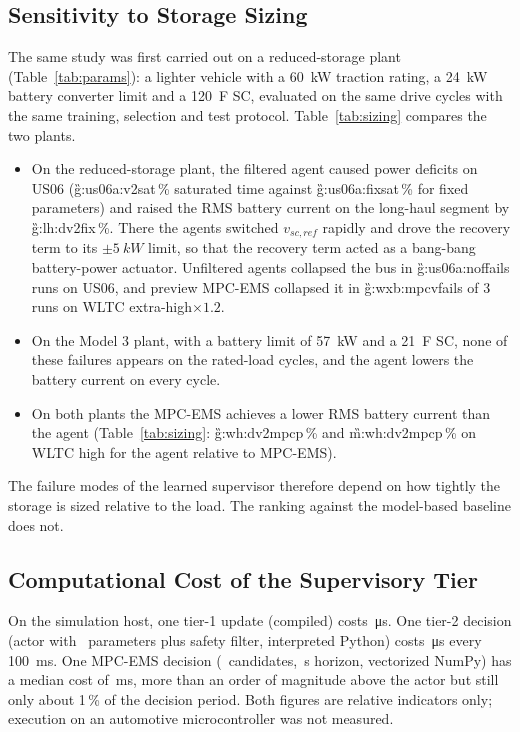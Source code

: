 \subsection{Sensitivity to Storage Sizing}\label{sec:res_sizing}

The same study was first carried out on a reduced-storage plant (Table~\ref{tab:params}): a lighter vehicle with a \SI{60}{kW} traction rating, a \SI{24}{kW} battery converter limit and a \SI{120}{F} SC, evaluated on the same drive cycles with the same training, selection and test protocol. Table~\ref{tab:sizing} compares the two plants.
\begin{itemize}
\item On the reduced-storage plant, the filtered agent caused power deficits on US06 (\G{g:us06a:v2sat}\,\% saturated time against \G{g:us06a:fixsat}\,\% for fixed parameters) and raised the RMS battery current on the long-haul segment by \G{g:lh:dv2fix}\,\%. There the agents switched $v_{sc,ref}$ rapidly and drove the recovery term to its $\pm\SI{5}{kW}$ limit, so that the recovery term acted as a bang-bang battery-power actuator. Unfiltered agents collapsed the bus in \G{g:us06a:noffails} runs on US06, and preview MPC-EMS collapsed it in \G{g:wxb:mpcvfails} of 3 runs on WLTC extra-high$\times1.2$.
\item On the Model 3 plant, with a battery limit of \SI{57}{kW} and a \SI{21}{F} SC, none of these failures appears on the rated-load cycles, and the agent lowers the battery current on every cycle.
\item On both plants the MPC-EMS achieves a lower RMS battery current than the agent (Table~\ref{tab:sizing}: \G{g:wh:dv2mpcp}\,\% and \G{m:wh:dv2mpcp}\,\% on WLTC high for the agent relative to MPC-EMS).
\end{itemize}
The failure modes of the learned supervisor therefore depend on how tightly the storage is sized relative to the load. The ranking against the model-based baseline does not.

\subsection{Computational Cost of the Supervisory Tier}\label{sec:res_cost}
On the simulation host, one tier-1 update (compiled) costs \TimeADOSMC\,\si{\micro s}. One tier-2 decision (actor with \NActorParams\ parameters plus safety filter, interpreted Python) costs \TimeAgent\,\si{\micro s} every \SI{100}{ms}. One MPC-EMS decision (\NCandMPC\ candidates, \HorMPCP\,s horizon, vectorized NumPy) has a median cost of \TimeMPCEMS\,ms, more than an order of magnitude above the actor but still only about 1\,\% of the decision period. Both figures are relative indicators only; execution on an automotive microcontroller was not measured.
